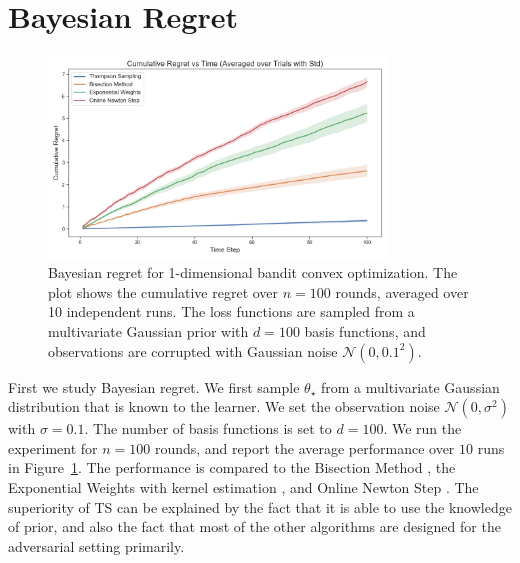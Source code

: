 \documentclass[letter, 12pt]{report}
\newcommand{\1}{\mathbf{1}}
\newcommand{\ts}{\textsc{TS}\xspace}
\theoremstyle{plain}
\theoremstyle{definition}
\theoremstyle{remark}
\begin{document}
\section{Bayesian Regret}
\label{sec:ts-empirical-results-bayesian}
\begin{figure}[h!]
    \centering
    \includegraphics[width=0.8\textwidth]{figures/bayesian_regret.png}
    \caption{Bayesian regret for 1-dimensional bandit convex optimization.
        The plot shows the cumulative regret over $n = 100$ rounds, averaged over 10 independent runs.
        The loss functions are sampled from a multivariate Gaussian prior with $d = 100$ basis functions,
        and observations are corrupted with Gaussian noise $\mathcal{N}(0, 0.1^2)$.}
    \label{fig:bayesian-regret}
\end{figure}
First we study Bayesian regret.
We first sample $\theta_\star$ from a multivariate Gaussian distribution
that is known to the learner.
We set the observation noise $\mathcal{N}(0, \sigma^2)$
with $\sigma = 0.1$.
The number of basis functions is set to $d = 100$.
We run the experiment for $n = 100$ rounds,
and report the average performance over $10$ runs in Figure~\ref{fig:bayesian-regret}.
The performance is compared to the Bisection Method \citep{agarwal2010optimal},
the Exponential Weights with kernel estimation \citep{BEL16}, and
Online Newton Step \citep{LFMV24-improved}.
The superiority of \ts can be explained by the fact that
it is able to use the knowledge of prior, and also the fact that
most of the other algorithms are designed for the adversarial setting primarily.
\end{document}
